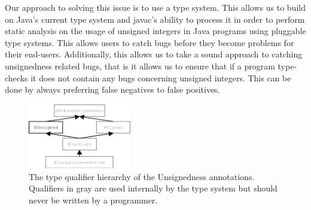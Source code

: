 \documentclass{sigplanconf}
\begin{document}
Our approach to solving this issue is to use a type system. This allows us to build on Java's current type system and javac's ability to process it in order to perform static analysis on the usage of unsigned integers in Java programs using pluggable type systems. This allows users to catch bugs before they become problems for their end-users. Additionally, this allows us to take a sound approach to catching unsignedness related bugs, that is it allows us to ensure that if a program type-checks it does not contain any bugs concerning unsigned integers. This can be done by always preferring false negatives to false positives.

\begin{figure}
    \centering
    \includegraphics[width=0.4\textwidth]{unsignedness}
    \caption{The type qualifier hierarchy of the Unsignedness annotations.
Qualifiers in gray are used internally by the type system but should never be written by a programmer.}
    \label{fig:my_label}
\end{figure}
\end{document}
